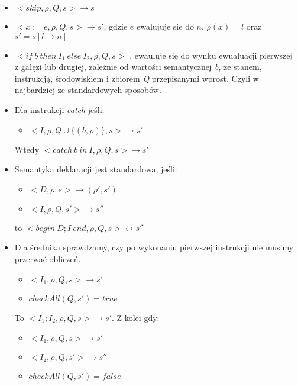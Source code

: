 \documentclass[11pt]{article}
\begin{document}
\begin{itemize}
\item $<skip, \rho, Q, s> \longrightarrow s$

\item $<x := e, \rho, Q, s> \longrightarrow s'$, gdzie $e$ ewalujuje sie do $n$, $\rho(x) = l$ oraz $s' = s[l\rightarrow n]$

\item $<if \  b \  then \   I_{1} \    else \  I_{2}, \rho, Q, s>$
, ewauluje się do wynku ewualuacji pierwszej z gałęzi lub drugiej, zależnie od wartości semantycznej \textit{b}, ze stanem, instrukcją, środowiskiem i zbiorem \textit{Q} przepisanymi wprost.
Czyli w najbardziej ze standardowych sposobów.

\item Dla instrukcji \textit{catch} jeśli:

\begin{itemize}
\item $<I, \rho, Q \cup \{(b, \rho)\}, s> \longrightarrow s'$
\end{itemize}

Wtedy $<catch \ b \  in \ I, \rho, Q, s> \longrightarrow s'$

\item Semantyka deklaracji jest standardowa, jeśli:

\begin{itemize}
\item $<D, \rho, s> \longrightarrow (\rho', s')$
\item $<I, \rho, Q, s'> \longrightarrow s''$
\end{itemize}

to $<begin \ D;I \ end, \rho, Q, s> \longleftrightarrow s''$

\item Dla średnika sprawdzamy, czy po wykonaniu pierwszej instrukcji nie musimy przerwać obliczeń.

\begin{itemize}
\item $<I_{1}, \rho, Q, s> \rightarrow s'$
\item $checkAll(Q, s') = true$
\end{itemize}

To $<I_{1};I_{2}, \rho, Q, s> \longrightarrow s'$. Z kolei gdy:

\begin{itemize}
\item $<I_{1}, \rho, Q, s> \rightarrow s'$
\item $<I_{2}, \rho, Q, s'> \rightarrow s''$
\item $checkAll(Q, s') = false$
\end{itemize}


\end{itemize}
\end{document}

